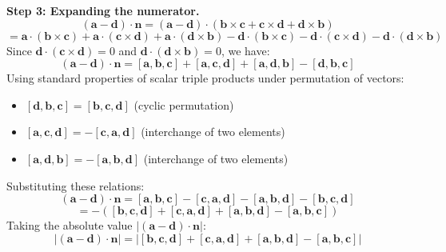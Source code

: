 \documentclass[11pt,a4paper]{article}
\begin{document}
\textbf{Step 3: Expanding the numerator.}\\
$$(\mathbf{a} - \mathbf{d}) \cdot \mathbf{n} = (\mathbf{a} - \mathbf{d}) \cdot (\mathbf{b}\times\mathbf{c} + \mathbf{c}\times\mathbf{d} + \mathbf{d}\times\mathbf{b})$$
$$= \mathbf{a}\cdot(\mathbf{b}\times\mathbf{c}) + \mathbf{a}\cdot(\mathbf{c}\times\mathbf{d}) + \mathbf{a}\cdot(\mathbf{d}\times\mathbf{b}) - \mathbf{d}\cdot(\mathbf{b}\times\mathbf{c}) - \mathbf{d}\cdot(\mathbf{c}\times\mathbf{d}) - \mathbf{d}\cdot(\mathbf{d}\times\mathbf{b})$$
Since $\mathbf{d}\cdot(\mathbf{c}\times\mathbf{d}) = 0$ and $\mathbf{d}\cdot(\mathbf{d}\times\mathbf{b}) = 0$, we have:
$$(\mathbf{a} - \mathbf{d}) \cdot \mathbf{n} = [\mathbf{a}, \mathbf{b}, \mathbf{c}] + [\mathbf{a}, \mathbf{c}, \mathbf{d}] + [\mathbf{a}, \mathbf{d}, \mathbf{b}] - [\mathbf{d}, \mathbf{b}, \mathbf{c}]$$
Using standard properties of scalar triple products under permutation of vectors:
\begin{itemize}
    \item $[\mathbf{d}, \mathbf{b}, \mathbf{c}] = [\mathbf{b}, \mathbf{c}, \mathbf{d}]$ (cyclic permutation)
    \item $[\mathbf{a}, \mathbf{c}, \mathbf{d}] = -[\mathbf{c}, \mathbf{a}, \mathbf{d}]$ (interchange of two elements)
    \item $[\mathbf{a}, \mathbf{d}, \mathbf{b}] = -[\mathbf{a}, \mathbf{b}, \mathbf{d}]$ (interchange of two elements)
\end{itemize}
Substituting these relations:
$$(\mathbf{a} - \mathbf{d}) \cdot \mathbf{n} = [\mathbf{a}, \mathbf{b}, \mathbf{c}] - [\mathbf{c}, \mathbf{a}, \mathbf{d}] - [\mathbf{a}, \mathbf{b}, \mathbf{d}] - [\mathbf{b}, \mathbf{c}, \mathbf{d}]$$
$$= -\left( [\mathbf{b}, \mathbf{c}, \mathbf{d}] + [\mathbf{c}, \mathbf{a}, \mathbf{d}] + [\mathbf{a}, \mathbf{b}, \mathbf{d}] - [\mathbf{a}, \mathbf{b}, \mathbf{c}] \right)$$
Taking the absolute value $|(\mathbf{a} - \mathbf{d}) \cdot \mathbf{n}|$:
$$|(\mathbf{a} - \mathbf{d}) \cdot \mathbf{n}| = \left| [\mathbf{b}, \mathbf{c}, \mathbf{d}] + [\mathbf{c}, \mathbf{a}, \mathbf{d}] + [\mathbf{a}, \mathbf{b}, \mathbf{d}] - [\mathbf{a}, \mathbf{b}, \mathbf{c}] \right|$$
\end{document}
